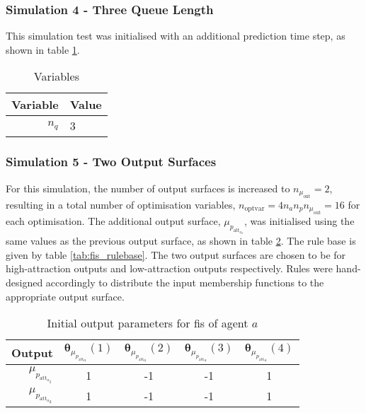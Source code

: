 \documentclass[conference]{IEEEtran}
\begin{document}
\subsubsection{Simulation 4 - Three Queue Length} \label{subsubsec:SS04}

This simulation test was initialised with an additional prediction time step, as shown in table \ref{tab:settings_SS04}.

\begin{table}[]
    \centering
    \caption{Variables}
    \label{tab:settings_SS04}
    \begin{tabular}{r|l}
        \toprule
        Variable & Value \\
        \midrule
        $n_{q}$ & 3 \\
        \bottomrule
    \end{tabular}
\end{table}

\subsubsection{Simulation 5 - Two Output Surfaces} \label{subsubsec:SS05}

For this simulation, the number of output surfaces is increased to $n_{\mu_{\text{out}}} = 2$, resulting in a total number of optimisation variables, $n_{\text{optvar}} = 4 n_{a} n_{p} n_{\mu_{\text{out}}} = 16$ for each optimisation.
The additional output surface, $\mu_{p_{\text{att}_{a_{2}}}}$, was initialised using the same values as the previous output surface, as shown in table \ref{tab:settings_SS05}.
The rule base is given by table \ref{tab:fis_rulebase}.
The two output surfaces are chosen to be for high-attraction outputs and low-attraction outputs respectively.
Rules were hand-designed accordingly to distribute the input membership functions to the appropriate output surface.

\begin{table}
    \centering
    \caption{Initial output parameters for \gls{fis} of agent $a$}
    \label{tab:settings_SS05}
    \begin{tabular}{r|cccc}
        \toprule
        Output & $\bm{\theta}_{\mu_{p_{\text{att}_{a}}}}(1)$ & $\bm{\theta}_{\mu_{p_{\text{att}_{a}}}}(2)$ & $\bm{\theta}_{\mu_{p_{\text{att}_{a}}}}(3)$ & $\bm{\theta}_{\mu_{p_{\text{att}_{a}}}}(4)$ \\
        \midrule
         $\mu_{p_{\text{att}_{a_{1}}}}$ & 1 & -1 & -1 & 1 \\
         $\mu_{p_{\text{att}_{a_{2}}}}$ & 1 & -1 & -1 & 1 \\
        \bottomrule
    \end{tabular}
\end{table}
\end{document}

